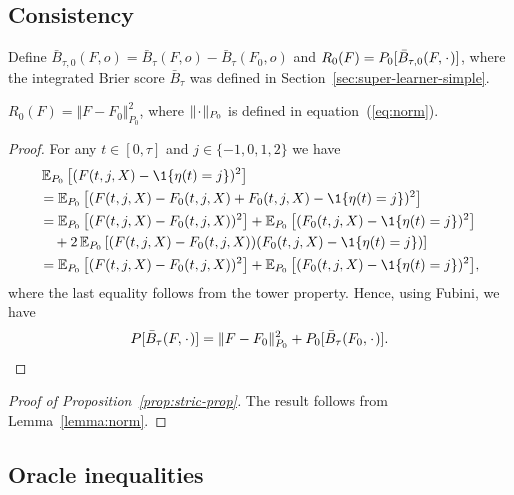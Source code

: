 \subsection{Consistency}
\label{sec:consistency-proof}

Define
\( \bar{B}_{\tau,0}(F, o) = \bar{B}_{\tau}(F, o) - \bar{B}_{\tau}(F_0, o) \) and
\( R_{0}(F) = P_0{[\bar{B}_{\tau,0}(F, \blank)]} \), where the integrated Brier
score \( \bar{B}_{\tau} \) was defined in
Section~\ref{sec:super-learner-simple}.
\begin{lemma}
  \label{lemma:norm}
  \( R_{0}(F) = \Vert F - F_0 \Vert_{P_0}^2 \), where \( \Vert \blank \Vert_{P_0}\) is defined
  in equation~(\ref{eq:norm}).
\end{lemma}
\begin{proof}[Proof]
  For any \( t \in [0, \tau] \) and \( j\in \{-1,0,1,2\} \) we have
  \begin{align*}
    & \E_{P_0}{\left[ (F(t, j, X) - \1{\{\eta(t) = j \}})^2 \right]}
    \\
    & =    \E_{P_0}{\left[ (F(t, j, X) - F_0(t, j, X) + F_0(t, j, X) - \1{\{\eta(t) = j
      \}})^2 \right]}
    \\
    & =    \E_{P_0}{\left[ (F(t, j, X) - F_0(t, j, X))^2\right]}
      + \E_{P_0}{\left[ (F_0(t, j, X) - \1{\{\eta(t) = j \}})^2\right]}
    \\
    & \quad
      + 2\E_{P_0}{\left[ (F(t, j, X) - F_0(t, j, X))(F_0(t, j, X) - \1{\{\eta(t) = j
      \}})\right]}
    \\
    & =    \E_{P_0}{\left[ (F(t, j, X) - F_0(t, j, X))^2\right]}
      + \E_{P_0}{\left[ (F_0(t, j, X) - \1{\{\eta(t) = j \}})^2\right]},
  \end{align*}
  where the last equality follows from the tower property. Hence, using Fubini,
  we have
  \begin{equation*}
    P{[\bar{B}_{\tau}(F, \blank)]}
    = \Vert F - F_0 \Vert_{P_0}^2 + P_0{[\bar{B}_{\tau}(F_0, \blank)]}.
  \end{equation*}
\end{proof}

\begin{proof}[Proof of Proposition~\ref{prop:stric-prop}]
  The result follows from Lemma~\ref{lemma:norm}.
\end{proof}

\subsection{Oracle inequalities}
\label{sec:oracle-inequalities}

